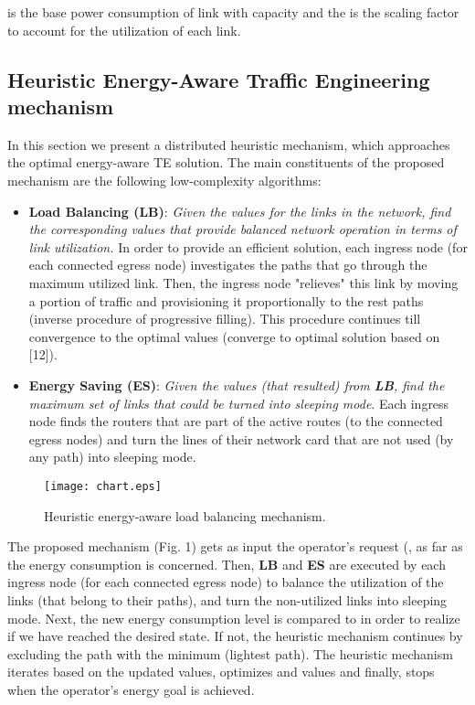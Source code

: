 \documentclass[journal]{IEEEtran}
\begin{document}
 is the base power consumption of link  with capacity  and the  is the scaling factor to account for the utilization of each link.

\subsection{Heuristic Energy-Aware Traffic Engineering mechanism}
In this section we present a distributed heuristic mechanism, which approaches the optimal energy-aware TE solution. The main constituents of the proposed mechanism are the following low-complexity algorithms:
\begin{itemize}
  \item \textbf{Load Balancing (LB)}: \emph{Given the  values for the links in the network, find the corresponding  values that provide balanced network operation in terms of link utilization.}  In order to provide an efficient solution, each ingress node (for each connected egress node) investigates the paths that go through the maximum utilized link. Then, the ingress node "relieves" this link by moving a portion of traffic  and provisioning it proportionally to the rest paths (inverse procedure of progressive filling). This procedure continues till convergence to the optimal  values (converge to optimal solution based on [12]).
  \item \textbf{Energy Saving (ES)}: \emph{Given the  values (that resulted) from \textbf{LB}, find the maximum set of links that could be turned into sleeping mode}. Each ingress node finds the routers that are part of the active routes (to the connected egress nodes) and turn the lines of their network card that are not used (by any path) into sleeping mode.
\end{itemize}

\begin{figure}\vspace{-0.2in}
\centering
\texttt{[image: chart.eps]}\vspace{-0.1in}
\caption{Heuristic energy-aware load balancing mechanism.} \label{fig1}
\vspace{-0.2in}
\end{figure}

The proposed mechanism (Fig. 1) gets as input the operator's request (, as far as the energy consumption is concerned. Then, \textbf{LB} and \textbf{ES} are executed by each ingress node (for each connected egress node) to balance the utilization of the links (that belong to their paths), and turn the non-utilized links into sleeping mode. Next, the new energy consumption level is compared to  in order to realize if we have reached the desired state. If not, the heuristic mechanism continues by excluding the path  with the minimum  (lightest path). The heuristic mechanism iterates based on the updated  values, optimizes  and  values  and finally, stops when the operator's energy goal is achieved.
\end{document}
